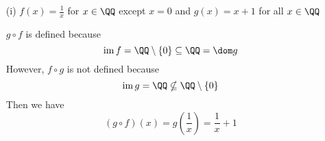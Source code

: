 \documentclass{article}
\DeclareMathOperator{\ima}{im}
\begin{document}
\begin{itemize}
\begin{itemize}
			\item[(i)] $f(x)=\frac{1}{x}$ for $x\in\QQ$ except $x=0$ and $g(x)=x+1$ for all $x\in\QQ$
				\begin{soln}
					$g\circ f$ is defined because
					\[\ima f = \QQ\setminus\left\{ 0 \right\} \subseteq \QQ = \dom g\]
					However, $f\circ g$ is not defined because
					\[\ima g = \QQ \nsubseteq \QQ\setminus\left\{ 0 \right\}\]
					Then we have
					\[(g\circ f)(x) = g\left( \frac{1}{x} \right) = \frac{1}{x} + 1\]
				\end{soln}
				
		\end{itemize}
		
\end{itemize}
\end{document}
